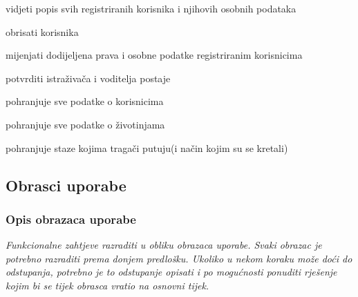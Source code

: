 \begin{packed_enum}
				\item  {}
				
				\begin{packed_enum}
					\item vidjeti popis svih registriranih korisnika i njihovih osobnih podataka
					\item obrisati korisnika
					\item mijenjati dodijeljena prava i osobne podatke registriranim korisnicima
					\item potvrditi istraživača i voditelja postaje
				\end{packed_enum}

				\item  {}
				
				\begin{packed_enum}
					\item pohranjuje sve podatke o korisnicima 
					\item pohranjuje sve podatke o životinjama
					\item pohranjuje staze kojima tragači putuju(i način kojim su se kretali)
				\end{packed_enum}


			\end{packed_enum}
			
			\eject 
			
			
				
			\subsection{Obrasci uporabe}
								
				\subsubsection{Opis obrazaca uporabe}
					\textit{Funkcionalne zahtjeve razraditi u obliku obrazaca uporabe. Svaki obrazac je potrebno razraditi prema donjem predlošku. Ukoliko u nekom koraku može doći do odstupanja, potrebno je to odstupanje opisati i po mogućnosti ponuditi rješenje kojim bi se tijek obrasca vratio na osnovni tijek.}\\
					

